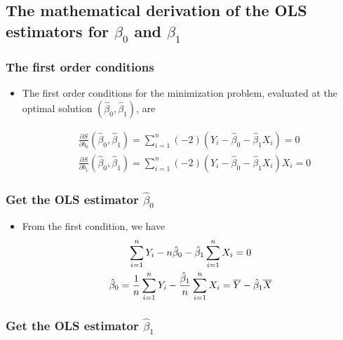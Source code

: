 \documentclass[11pt]{article}
\begin{document}
\subsection*{The mathematical derivation of the OLS estimators for \(\beta_0\) and \(\beta_1\)}
\label{sec:orgc2c997b}

\subsubsection*{The first order conditions}
\label{sec:org1901fbc}

\begin{itemize}
\item The first order conditions for the minimization problem, evaluated
at the optimal solution \((\hat{\beta}_0, \hat{\beta}_1)\), are

\begin{align}
& \frac{\partial S}{\partial b_0}(\hat{\beta}_0, \hat{\beta}_1) = \sum_{i=1}^n (-2)(Y_i - \hat{\beta}_0 - \hat{\beta}_1 X_i) = 0  \label{eq:b-0} \\
& \frac{\partial S}{\partial b_1}(\hat{\beta}_0, \hat{\beta}_1) = \sum_{i=1}^n (-2)(Y_i - \hat{\beta}_0 - \hat{\beta}_1 X_i) X_i = 0 \label{eq:b-1}
\end{align}
\end{itemize}

\subsubsection*{Get the OLS estimator \(\hat{\beta}_0\)}
\label{sec:org4420fca}

\begin{itemize}
\item From the first condition, we have
\begin{gather}
\sum_{i=1}^n Y_i - n \hat{\beta}_0 - \hat{\beta}_1 \sum_{i=1}^n X_i = 0 \notag  \\
\hat{\beta}_0 = \frac{1}{n} \sum_{i=1}^n Y_i - \frac{\hat{\beta}_1}{n}\sum_{i=1}^n X_i = \overline{Y} - \hat{\beta}_1 \overline{X} \label{eq:bhat-0}
\end{gather}
\end{itemize}

\subsubsection*{Get the OLS estimator \(\hat{\beta}_1\)}
\label{sec:org53349f3}
\end{document}
